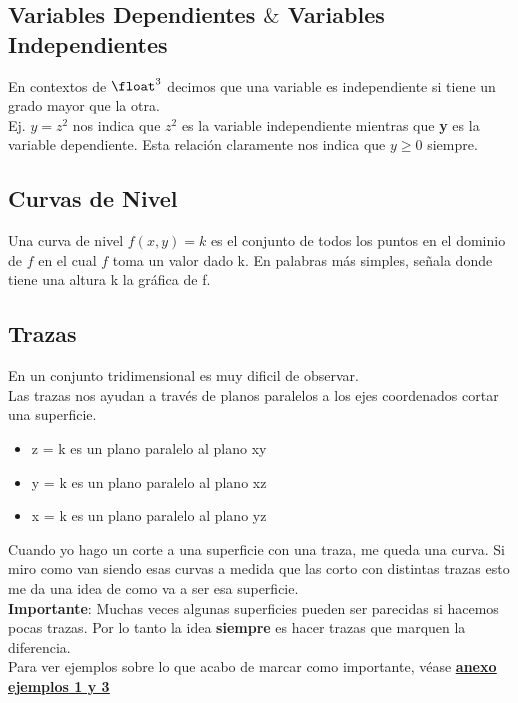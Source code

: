 \documentclass[10pt,a4paper]{article}
\begin{document}
\subsection*{Variables Dependientes $\&$ Variables Independientes}
En contextos de $\float^{3}$ decimos que una variable es independiente si tiene un grado mayor que la otra. \\
Ej. $y = z^{2}$ nos indica que $z^{2}$ es la variable independiente mientras que \textbf{y} es la variable dependiente. Esta relación claramente nos indica que $y \ge 0 $ siempre.
\subsection*{Curvas de Nivel}
Una curva de nivel $f(x,y) = k$ es el conjunto de todos los puntos en el dominio de $f$ en el cual $f$ toma un valor dado k. En palabras más simples, señala donde tiene una altura k la gráfica de f. \\

\subsection*{Trazas}
En un conjunto tridimensional es muy dificil de observar. \\
Las trazas nos ayudan a través de planos paralelos a los ejes coordenados cortar una superficie.
\begin{itemize}
    \item z = k es un plano paralelo al plano xy
    \item y = k es un plano paralelo al plano xz
    \item x = k es un plano paralelo al plano yz
\end{itemize}
Cuando yo hago un corte a una superficie con una traza, me queda una curva. Si miro como van siendo esas curvas a medida que las corto con distintas trazas esto me da una idea de como va a ser esa superficie. \\
\textbf{Importante}: Muchas veces algunas superficies pueden ser parecidas si hacemos pocas trazas. Por lo tanto la idea \textbf{siempre} es hacer trazas que marquen la diferencia. \\
Para ver ejemplos sobre lo que acabo de marcar como importante, véase \hyperref[subsec:dibujando_cuadricas_con_trazas]{\textbf{\underline{anexo ejemplos 1 y 3}}} 
\end{document}
